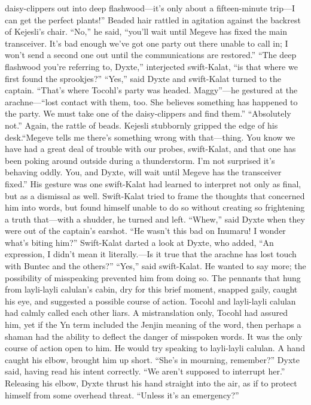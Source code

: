 \documentclass[9pt]{article}
\begin{document}
daisy-clippers out into deep flashwood—it’s only about a fifteen-minute trip—I can get the perfect
plants!”
Beaded hair rattled in agitation against the backrest of Kejesli’s chair. “No,” he said, “you’ll wait until
Megeve has fixed the main transceiver. It’s bad enough we’ve got one party out there unable to call in; I
won’t send a second one out until the communications are restored.”
“The deep flashwood you’re referring to, Dyxte,” interjected swift-Kalat, “is that where we first
found the sprookjes?”
“Yes,” said Dyxte and swift-Kalat turned to the captain.
“That’s where Tocohl’s party was headed. Maggy”—he gestured at the arachne—“lost contact with
them, too. She believes something has happened to the party. We must take one of the daisy-clippers
and find them.”
“Absolutely not.” Again, the rattle of beads. Kejesli stubbornly gripped the edge of his desk.“Megeve tells me there’s something wrong with that—thing. You know we have had a great deal of
trouble with our probes, swift-Kalat, and that one has been poking around outside during a
thunderstorm. I’m not surprised it’s behaving oddly. You, and Dyxte, will wait until Megeve has the
transceiver fixed.” His gesture was one swift-Kalat had learned to interpret not only as final, but as a
dismissal as well.
Swift-Kalat tried to frame the thoughts that concerned him into words, but found himself unable to do
so without creating so frightening a truth that—with a shudder, he turned and left.
“Whew,” said Dyxte when they were out of the captain’s earshot. “He wasn’t this bad on Inumaru! I
wonder what’s biting him?” Swift-Kalat darted a look at Dyxte, who added, “An expression, I didn’t
mean it literally.—Is it true that the arachne has lost touch with Buntec and the others?”
“Yes,” said swift-Kalat. He wanted to say more; the possibility of misspeaking prevented him from
doing so. The pennants that hung from layli-layli calulan’s cabin, dry for this brief moment, snapped
gaily, caught his eye, and suggested a possible course of action.
Tocohl and layli-layli calulan had calmly called each other liars. A mistranslation only, Tocohl had
assured him, yet if the Yn term included the Jenjin meaning of the word, then perhaps a shaman had the
ability to deflect the danger of misspoken words.
It was the only course of action open to him. He would try speaking to layli-layli calulan.
A hand caught his elbow, brought him up short. “She’s in mourning, remember?” Dyxte said, having
read his intent correctly. “We aren’t supposed to interrupt her.” Releasing his elbow, Dyxte thrust his
hand straight into the air, as if to protect himself from some overhead threat. “Unless it’s an emergency?”
\end{document}
